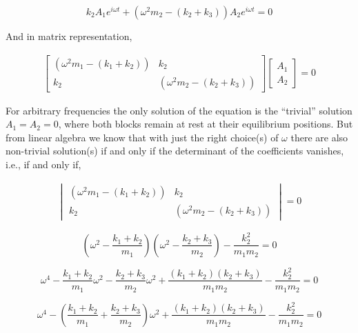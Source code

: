 \begin{equation}
    \label{x6}
   k_2 A_1 e^{i\omega t}  +(\omega^2 m_2  - (k_2 + k_3))A_2e^{i\omega t} = 0 
\end{equation}

And in matrix representation,

\begin{gather}
    \begin{bmatrix}
(\omega^2 m_1  -(k_1 + k_2)) & k_2\\k_2& (\omega^2 m_2  - (k_2 + k_3))
\end{bmatrix}\begin{bmatrix}
A_1 \\ A_2
\end{bmatrix}
 = 0
\end{gather}


For arbitrary frequencies the only solution of the equation is the “trivial” solution $A_1 = A_2 = 0$,  where both blocks remain at rest at their equilibrium positions. But from linear algebra we know that with just the right choice(s) of $\omega$ there are also non-trivial solution(s) if and only if the determinant of the coefficients vanishes, i.e., if and only if, 

\begin{gather}
    \begin{vmatrix}
(\omega^2 m_1  -(k_1 + k_2)) & k_2 \\
k_2 & (\omega^2 m_2  - (k_2 + k_3))
\end{vmatrix} = 0
\end{gather}

\begin{equation}
   \left( {{\omega ^2} - \frac{{{k_1} + {k_2}}}{{{m_1}}}} \right) \left( {{\omega ^2} - \frac{{{k_2} + {k_3}}}{{{m_2}}}} \right) - \frac{{k_2^2}}{{{m_1}{m_2}}} = 0
\end{equation}

\begin{equation}
    {\omega ^4} - \frac{{{k_1} + {k_2}}}{{{m_1}}}{\omega ^2} - \frac{{{k_2} + {k_3}}}{{{m_2}}}{\omega ^2}
+ \frac{{\left( {{k_1} + {k_2}} \right)\left( {{k_2} + {k_3}} \right)}}{{{m_1}{m_2}}} - \frac{{k_2^2}}{{{m_1}{m_2}}} = 0
\end{equation}

\begin{equation}
    {\omega ^4} - \left( {\frac{{{k_1} + {k_2}}}{{{m_1}}} + \frac{{{k_2} + {k_3}}}{{{m_2}}}} \right){\omega ^2}
+ \frac{{\left( {{k_1} + {k_2}} \right)\left( {{k_2} + {k_3}} \right)}}{{{m_1}{m_2}}} - \frac{{k_2^2}}{{{m_1}{m_2}}} = 0
\end{equation}


